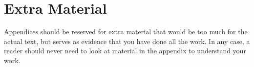 \chapter{Extra Material}

Appendices should be reserved for extra material that would be too much for the actual text, but serves as evidence that you have done all the work. In any case, a reader should never need to look at material in the appendix to understand your work.